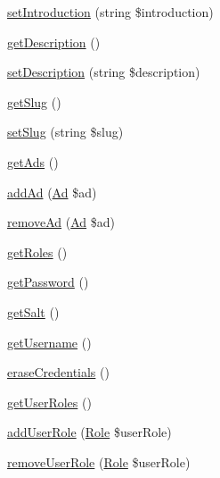 \begin{DoxyCompactItemize}
\mbox{\hyperlink{class_app_1_1_entity_1_1_user_a2783619c7c20ec3cdce7706c8e617324}{set\+Introduction}} (string \$introduction)
\item 
\mbox{\hyperlink{class_app_1_1_entity_1_1_user_a2e7bb35c71bf1824456ceb944cb7a845}{get\+Description}} ()
\item 
\mbox{\hyperlink{class_app_1_1_entity_1_1_user_a3eda7afea80371b606cd289c66ab3e7c}{set\+Description}} (string \$description)
\item 
\mbox{\hyperlink{class_app_1_1_entity_1_1_user_aba91cb698fc762d9fc0975c9f73ae9c4}{get\+Slug}} ()
\item 
\mbox{\hyperlink{class_app_1_1_entity_1_1_user_a80553db2cd69e4c5c48c124c95385012}{set\+Slug}} (string \$slug)
\item 
\mbox{\hyperlink{class_app_1_1_entity_1_1_user_ac3c8999d4e6f0c34294f36a2096592f2}{get\+Ads}} ()
\item 
\mbox{\hyperlink{class_app_1_1_entity_1_1_user_a7d241864594cb22027cc541da209ef62}{add\+Ad}} (\mbox{\hyperlink{class_app_1_1_entity_1_1_ad}{Ad}} \$ad)
\item 
\mbox{\hyperlink{class_app_1_1_entity_1_1_user_a7d571f5d5424394cd810e9d319861e48}{remove\+Ad}} (\mbox{\hyperlink{class_app_1_1_entity_1_1_ad}{Ad}} \$ad)
\item 
\mbox{\hyperlink{class_app_1_1_entity_1_1_user_aa676cae5ee8d7fb6862a8724adc2660d}{get\+Roles}} ()
\item 
\mbox{\hyperlink{class_app_1_1_entity_1_1_user_a04e0957baeb7acde9c0c86556da2d43f}{get\+Password}} ()
\item 
\mbox{\hyperlink{class_app_1_1_entity_1_1_user_a1dfe56d2c965d451a135f3f3910a8b8d}{get\+Salt}} ()
\item 
\mbox{\hyperlink{class_app_1_1_entity_1_1_user_a81b37a3c9d639574e394f80c1138c75e}{get\+Username}} ()
\item 
\mbox{\hyperlink{class_app_1_1_entity_1_1_user_ac565b8c00fe93ce673f8237849f072a6}{erase\+Credentials}} ()
\item 
\mbox{\hyperlink{class_app_1_1_entity_1_1_user_a8f1f7dad2f488ae5d74dc31bf26368e9}{get\+User\+Roles}} ()
\item 
\mbox{\hyperlink{class_app_1_1_entity_1_1_user_a5dfec06ae4ff6f4acd120a4c25de760a}{add\+User\+Role}} (\mbox{\hyperlink{class_app_1_1_entity_1_1_role}{Role}} \$user\+Role)
\item 
\mbox{\hyperlink{class_app_1_1_entity_1_1_user_a94e81ecdfcb8322ff870c16598090559}{remove\+User\+Role}} (\mbox{\hyperlink{class_app_1_1_entity_1_1_role}{Role}} \$user\+Role)

\end{DoxyCompactItemize}
